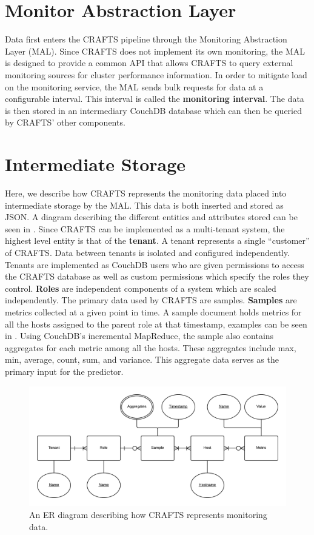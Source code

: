 \section{Monitor Abstraction Layer}
Data first enters the CRAFTS pipeline through the Monitoring Abstraction Layer (\textsf{MAL}). Since CRAFTS does not implement its own monitoring, the \textsf{MAL} is designed to provide a common API that allows CRAFTS to query external monitoring sources for cluster performance information. In order to mitigate load on the monitoring service, the \textsf{MAL} sends bulk requests for data at a configurable interval. This interval is called the \textbf{monitoring interval}. The data is then stored in an intermediary CouchDB database which can then be queried by CRAFTS' other components.

\section{Intermediate Storage}
Here, we describe how CRAFTS represents the monitoring data placed into intermediate storage by the \textsf{\textsf{MAL}}. This data is both inserted and stored as JSON. A diagram describing the different entities and attributes stored can be seen in . Since CRAFTS can be implemented as a multi-tenant system, the highest level entity is that of the \textbf{tenant}. A tenant represents a single ``customer'' of CRAFTS. Data between tenants is isolated and configured independently. Tenants are implemented as CouchDB users who are given permissions to access the CRAFTS database as well as custom permissions which specify the roles they control. \textbf{Roles} are independent components of a system which are scaled independently. The primary data used by CRAFTS are samples. \textbf{Samples} are metrics collected at a given point in time. A sample document holds metrics for all the hosts assigned to the parent role at that timestamp, examples can be seen in . Using CouchDB's incremental MapReduce, the sample also contains aggregates for each metric among all the hosts. These aggregates include max, min, average, count, sum, and variance. This aggregate data serves as the primary input for the \textsf{predictor}.

\begin{figure}
\centering
\includegraphics[width=\textwidth]{diagrams/datamodel.png}
\caption{An ER diagram describing how CRAFTS represents monitoring data.}
\label{fig:datamodel}
\end{figure}

